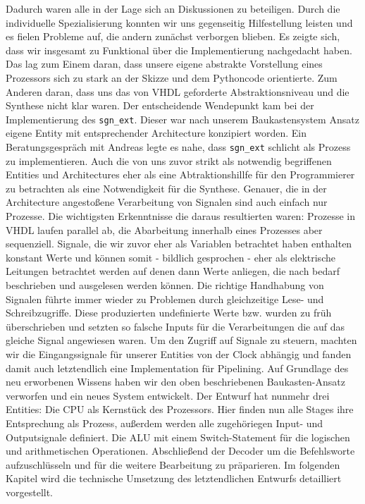 \documentclass[paper=a4,fontsize=12pt,twocolumn]{scrreprt}
\begin{document}
Dadurch waren alle in der Lage sich an Diskussionen zu beteiligen.
Durch die individuelle Spezialisierung konnten wir uns gegenseitig Hilfestellung leisten und es fielen Probleme auf, die andern zunächst verborgen blieben.
Es zeigte sich, dass wir insgesamt zu Funktional über die Implementierung nachgedacht haben.
Das lag zum Einem daran, dass unsere eigene abstrakte Vorstellung eines Prozessors sich zu stark an der Skizze und dem Pythoncode orientierte.
Zum Anderen daran, dass uns das von VHDL geforderte Abstraktionsniveau und die Synthese nicht klar waren.
Der entscheidende Wendepunkt kam bei der Implementierung des \texttt{sgn\_ext}.
Dieser war nach unserem Baukastensystem Ansatz eigene Entity mit entsprechender Architecture konzipiert worden.
Ein Beratungsgespräch mit Andreas legte es nahe, dass \texttt{sgn\_ext} schlicht als Prozess zu implementieren.
Auch die von uns zuvor strikt als notwendig begriffenen Entities und Architectures eher als eine Abtraktionshillfe für den Programmierer zu betrachten als eine Notwendigkeit für die Synthese.
Genauer, die in der Architecture angestoßene Verarbeitung von Signalen sind auch einfach nur Prozesse.
Die wichtigsten Erkenntnisse die daraus resultierten waren: Prozesse in VHDL laufen parallel ab, die Abarbeitung innerhalb eines Prozesses aber sequenziell.
Signale, die wir zuvor eher als Variablen betrachtet haben enthalten konstant Werte und können somit - bildlich gesprochen - eher als elektrische Leitungen betrachtet werden auf denen dann Werte anliegen, die nach bedarf beschrieben und ausgelesen werden können.
Die richtige Handhabung von Signalen führte immer wieder zu Problemen durch gleichzeitige Lese- und Schreibzugriffe.
Diese produzierten undefinierte Werte bzw. wurden zu früh überschrieben und setzten so falsche Inputs für die Verarbeitungen die auf das gleiche Signal angewiesen waren.
Um den Zugriff auf Signale zu steuern, machten wir die Eingangssignale für unserer Entities von der Clock abhängig und fanden damit auch letztendlich eine Implementation für Pipelining.
Auf Grundlage des neu erworbenen Wissens haben wir den oben beschriebenen Baukasten-Ansatz verworfen und ein neues System entwickelt. 
Der Entwurf hat nunmehr drei Entities: Die CPU als Kernstück des Prozessors.
Hier finden nun alle Stages ihre Entsprechung als Prozess, außerdem werden alle zugehöriegen Input- und Outputsignale definiert.
Die ALU mit einem Switch-Statement für die logischen und arithmetischen Operationen.
Abschließend der Decoder um die Befehlsworte aufzuschlüsseln und für die weitere Bearbeitung zu präparieren.
Im folgenden Kapitel wird die technische Umsetzung des letztendlichen Entwurfs detailliert vorgestellt.
\end{document}
